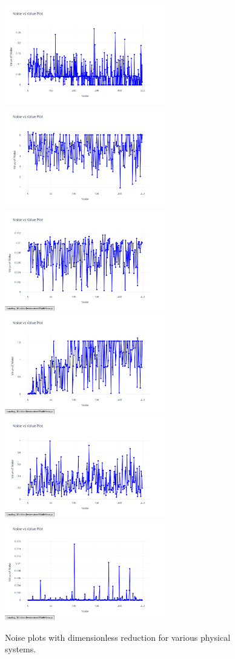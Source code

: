 \documentclass{article}
\begin{document}
\begin{figure}[H]
    \centering
    \includegraphics[width=7cm]{noise_conservation_d_r}
    \includegraphics[width=7cm]{noise_Newtons_First_Law_d_r}
    \includegraphics[width=7cm]{noise_Newtons_Second_Law_d_r}
    \includegraphics[width=7cm]{noise_Newtons_Third_Law_d_r}
    \includegraphics[width=7cm]{noise_Rutherford_d_r}
    \includegraphics[width=7cm]{noise_Simple_Harmonic_Motion_d_r}
    \caption{Noise plots with dimensionless reduction for various physical systems.}
    \label{fig:noise_dimless_plots}
\end{figure}
\end{document}
